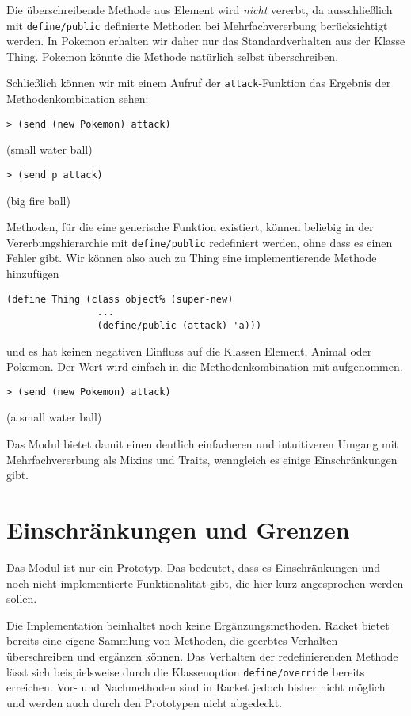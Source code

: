 Die überschreibende Methode aus Element wird \emph{nicht} vererbt, da ausschließlich mit \texttt{define/public} definierte Methoden bei Mehrfachvererbung berücksichtigt werden. In Pokemon erhalten wir daher nur das Standardverhalten aus der Klasse Thing. Pokemon könnte die Methode natürlich selbst überschreiben.

Schließlich können wir mit einem Aufruf der \texttt{attack}-Funktion das Ergebnis der Methodenkombination sehen:

\begin{lstlisting}
> (send (new Pokemon) attack)
\end{lstlisting}
{\rsymbol (small water ball)}

\begin{lstlisting}
> (send p attack)
\end{lstlisting}
{\rsymbol (big fire ball)}

Methoden, für die eine generische Funktion existiert, können beliebig in der Vererbungshierarchie mit \texttt{define/public} redefiniert werden, ohne dass es einen Fehler gibt. Wir können also auch zu Thing eine implementierende Methode hinzufügen

\begin{lstlisting}
(define Thing (class object% (super-new)
                ...
                (define/public (attack) 'a)))
\end{lstlisting}

und es hat keinen negativen Einfluss auf die Klassen Element, Animal oder Pokemon. Der Wert wird einfach in die Methodenkombination mit aufgenommen.

\begin{lstlisting}
> (send (new Pokemon) attack)
\end{lstlisting}
{\rsymbol (a small water ball)}

Das Modul bietet damit einen deutlich einfacheren und intuitiveren Umgang mit Mehrfachvererbung als Mixins und Traits, wenngleich es einige Einschränkungen gibt.

\section{Einschränkungen und Grenzen}
Das Modul ist nur ein Prototyp. Das bedeutet, dass es  Einschränkungen und noch nicht implementierte Funktionalität gibt, die hier kurz angesprochen werden sollen.

Die Implementation beinhaltet noch keine Ergänzungsmethoden. Racket bietet bereits eine eigene Sammlung von Methoden, die geerbtes Verhalten überschreiben und ergänzen können. Das Verhalten der redefinierenden Methode lässt sich beispielsweise durch die Klassenoption \texttt{define/override} bereits erreichen. Vor- und Nachmethoden sind in Racket jedoch bisher nicht möglich und werden auch durch den Prototypen nicht abgedeckt.

